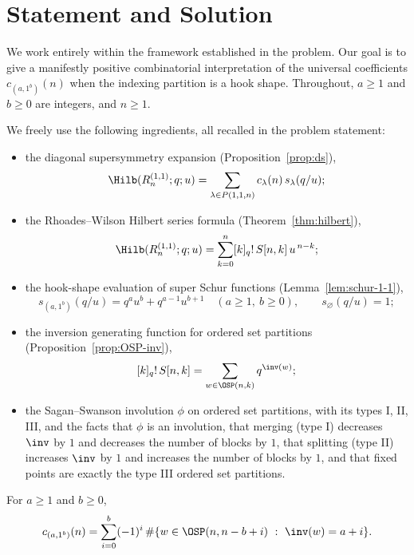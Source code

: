 \section{Statement and Solution}

We work entirely within the framework established in the problem. Our goal is to give a
manifestly positive combinatorial interpretation of the universal coefficients
$c_{(a,1^b)}(n)$ when the indexing partition is a hook shape. Throughout, $a\ge 1$ and
$b\ge 0$ are integers, and $n\ge 1$.

We freely use the following ingredients, all recalled in the problem statement:
\begin{itemize}
\item the diagonal supersymmetry expansion (Proposition~\ref{prop:ds}),
\begin{equation}\label{eq:ds}
\Hilb(R_n^{(1,1)};q;u)=\sum_{\lambda\in P(1,1,n)}c_\lambda(n)\,s_\lambda(q/u);
\end{equation}
\item the Rhoades--Wilson Hilbert series formula (Theorem~\ref{thm:hilbert}),
\begin{equation}\label{eq:rw}
\Hilb(R_n^{(1,1)};q;u)=\sum_{k=0}^n [k]_q!\,S[n,k]\,u^{\,n-k};
\end{equation}
\item the hook-shape evaluation of super Schur functions (Lemma~\ref{lem:schur-1-1}),
\begin{equation}\label{eq:hookschur}
s_{(a,1^b)}(q/u)=q^a u^b+q^{a-1}u^{b+1}\quad(a\ge1,\ b\ge0),\qquad s_\varnothing(q/u)=1;
\end{equation}
\item the inversion generating function for ordered set partitions
(Proposition~\ref{prop:OSP-inv}),
\begin{equation}\label{eq:osp}
[k]_q!\,S[n,k]=\sum_{w\in\OSP(n,k)}q^{\inv(w)};
\end{equation}
\item the Sagan--Swanson involution $\phi$ on ordered set partitions, with its types I,
II, III, and the facts that $\phi$ is an involution, that merging (type I) decreases
$\inv$ by $1$ and decreases the number of blocks by $1$, that splitting (type II) increases
$\inv$ by $1$ and increases the number of blocks by $1$, and that fixed points are exactly
the type III ordered set partitions.
\end{itemize}

\begin{lemma}\label{lem:signed}
For $a\ge1$ and $b\ge0$,
\begin{equation}\label{eq:signedformula}
c_{(a,1^b)}(n)=\sum_{i=0}^{b}(-1)^i\,\#\{w\in\OSP(n,n-b+i)\ :\ \inv(w)=a+i\}.
\end{equation}
\end{lemma}


